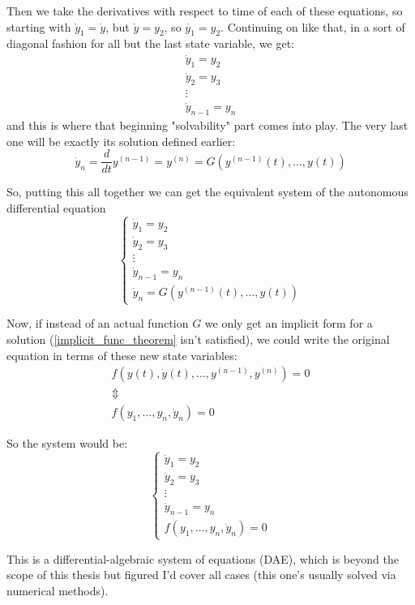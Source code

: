Then we take the derivatives with respect to time of each of these equations, so starting with $\dot{y}_1 = \dot{y}$, but $\dot{y} = y_2$, so $\dot{y_1}=y_2$. Continuing on like that, in a sort of diagonal fashion for all but the last state variable, we get:
\begin{gather*}
	\dot{y}_1 = y_2 \\
	\dot{y}_2 = y_3 \\
	\vdots \\
	\dot{y}_{n-1} = y_n
\end{gather*}
and this is where that beginning "solvability" part comes into play. The very last one will be exactly its solution defined earlier:
\[
	\dot{y}_n = \frac{d}{dt}y^{(n-1)} = y^{(n)}  = G(y^{(n-1)}(t), \dots, y(t))
\]

So, putting this all together we can get the equivalent system of the autonomous differential equation
\[
	\begin{cases}
		\dot{y}_1 = y_2     \\
		\dot{y}_2 = y_3     \\
		\vdots              \\
		\dot{y}_{n-1} = y_n \\
		\dot{y}_n  = G(y^{(n-1)}(t), \dots, y(t))
	\end{cases}
\]

Now, if instead of an actual function $G$ we only get an implicit form for a solution (\ref{implicit_func_theorem} isn't satisfied), we could write the original equation in terms of these new state variables:
\begin{gather*}
	f(y(t), \dot{y}(t),\dots,y^{(n-1)},y^{(n)})= 0 \\
	\Updownarrow \\
	f(y_1,\dots,y_n,\dot{y}_n) = 0
\end{gather*}

So the system would be:
\[
	\begin{cases}
		\dot{y}_1 = y_2     \\
		\dot{y}_2 = y_3     \\
		\vdots              \\
		\dot{y}_{n-1} = y_n \\
		f(y_1,\dots,y_n,\dot{y}_n) = 0
	\end{cases}
\]

This is a differential-algebraic system of equations (DAE), which is beyond the scope of this thesis but figured I'd cover all cases (this one's usually solved via numerical methods).

